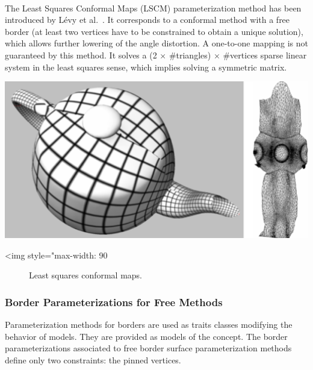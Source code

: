   \\

The Least Squares Conformal Maps (LSCM) parameterization method has
been introduced by L\'evy et al.~\cite{cgal:lprm-lscm-02}.
It corresponds to a conformal method with a free border (at least two
vertices have to be constrained to obtain a unique solution), which
allows further lowering of the angle distortion. A one-to-one mapping
is not guaranteed by this method. It solves a (2 $\times$
\#triangles) $\times$ \#vertices sparse linear system in the least squares sense,
which implies solving a symmetric matrix.

\begin{center}
    \label{Surface_mesh_parameterization-fig-LSCM}
    \begin{ccTexOnly}
        \includegraphics[width=1.0\textwidth]{Surface_mesh_parameterization/LSCM}
    \end{ccTexOnly}
    \begin{ccHtmlOnly}
        <img style="max-width: 90%
    \end{ccHtmlOnly}
    \begin{figure}[ht]
        \caption{Least squares conformal maps.}
    \end{figure}
\end{center}


\subsubsection{Border Parameterizations for Free Methods
\label{sec:Border-Parameterizations-for-Free-Methods}}

Parameterization methods for
borders are used as traits classes modifying the behavior of
 models. They are provided as models of the  concept.
The border parameterizations associated to free border surface
parameterization methods define only two constraints: the pinned vertices.

